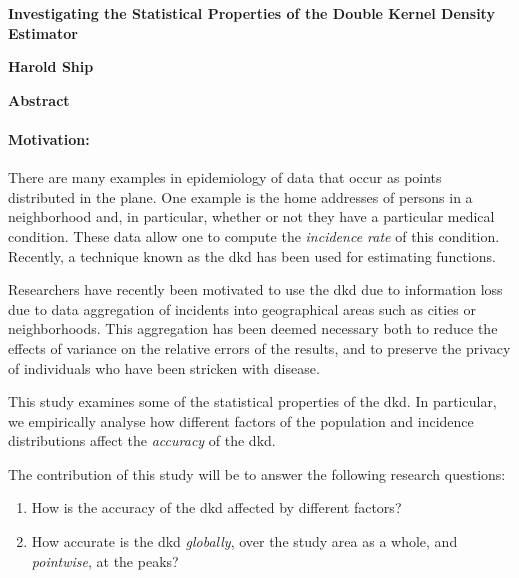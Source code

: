 


\begin{onehalfspace}

\begin{center}
    \vspace*{0.5cm}

    \textbf{\Large Investigating the Statistical Properties of the Double Kernel Density Estimator}

    \vspace*{1.0cm}

    \textbf{Harold Ship}

    \vspace*{1.0cm}

\end{center}

\noindent\textbf{\LARGE Abstract}

\paragraph*{Motivation:}

There are many examples in epidemiology of data that occur as points distributed in the plane.
One example is
the home addresses of persons in a neighborhood and,
in particular, whether or not they have a particular medical condition.
These data allow one to compute the \textit{incidence rate} of this condition.
Recently,
a technique known as the \acrlong{dkd} has been used for estimating  functions.

Researchers have recently been motivated to use the \acrlong{dkd} due to information loss due to data aggregation of incidents into geographical areas such as cities or neighborhoods.
This aggregation has been deemed necessary both
to reduce the effects of variance on the relative errors of the results,
and to preserve the privacy of individuals who have been stricken with disease.

This study examines some of the statistical properties of the \acrlong{dkd}.
In particular,
we empirically analyse how different factors of the population and incidence distributions
affect the \textit{accuracy} of the \acrlong{dkd}.

The contribution of this study will be to answer the following research questions:
\begin{enumerate}
    \item How is the accuracy of the \acrlong{dkd} affected by different factors?
    \item How accurate is the \acrlong{dkd} \textit{globally},
        over the study area as a whole,
        and \textit{pointwise}, at the peaks?
\end{enumerate}


\end{onehalfspace}
